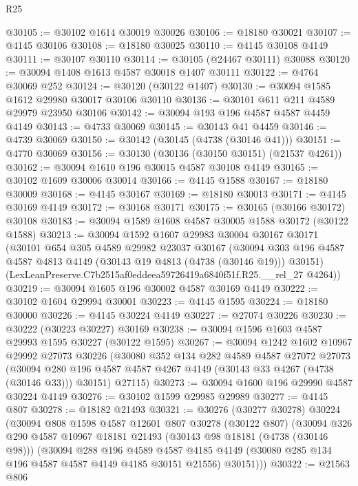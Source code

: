 \begin{lexlean}{R25}
\begin{coremodule}
@30105 := @30102 @1614 @30019 @30026
@30106 := @18180 @30021
@30107 := @4145 @30106
@30108 := @18180 @30025
@30110 := @4145 @30108 @4149
@30111 := @30107 @30110
@30114 := @30105 (@24467 @30111) @30088
@30120 := @30094 @1408 @1613 @4587 @30018 @1407 @30111
@30122 := @4764 @30069 @252
@30124 := @30120 (@30122 @1407)
@30130 := @30094 @1585 @1612 @29980 @30017 @30106 @30110
@30136 := @30101 @611 @211 @4589 @29979 @23950 @30106
@30142 := @30094 @193 @196 @4587 @4587 @4459 @4149
@30143 := @4733 @30069
@30145 := @30143 @41 @4459
@30146 := @4739 @30069
@30150 := @30142 (@30145 (@4738 (@30146 @41)))
@30151 := @4770 @30069
@30156 := @30130 (@30136 (@30150 @30151) (@21537 @4261))
@30162 := @30094 @1610 @196 @30015 @4587 @30108 @4149
@30165 := @30102 @1609 @30006 @30014
@30166 := @4145 @1588
@30167 := @18180 @30009
@30168 := @4145 @30167
@30169 := @18180 @30013
@30171 := @4145 @30169 @4149
@30172 := @30168 @30171
@30175 := @30165 (@30166 @30172) @30108
@30183 := @30094 @1589 @1608 @4587 @30005 @1588 @30172 (@30122 @1588)
@30213 := @30094
    @1592
    @1607
    @29983
    @30004
    @30167
    @30171
    (@30101
      @654
      @305
      @4589
      @29982
      @23037
      @30167
      (@30094 @303 @196 @4587 @4587 @4813 @4149 (@30143 @19 @4813 (@4738 (@30146 @19))) @30151)
      (LexLeanPreserve.C7b2515af0eddeea59726419a6840f51f.R25.__rel_27 @4264))
@30219 := @30094 @1605 @196 @30002 @4587 @30169 @4149
@30222 := @30102 @1604 @29994 @30001
@30223 := @4145 @1595
@30224 := @18180 @30000
@30226 := @4145 @30224 @4149
@30227 := @27074 @30226
@30230 := @30222 (@30223 @30227) @30169
@30238 := @30094 @1596 @1603 @4587 @29993 @1595 @30227 (@30122 @1595)
@30267 := @30094
    @1242
    @1602
    @10967
    @29992
    @27073
    @30226
    (@30080
      @352
      @134
      @282
      @4589
      @4587
      @27072
      @27073
      (@30094 @280 @196 @4587 @4587 @4267 @4149 (@30143 @33 @4267 (@4738 (@30146 @33))) @30151)
      @27115)
@30273 := @30094 @1600 @196 @29990 @4587 @30224 @4149
@30276 := @30102 @1599 @29985 @29989
@30277 := @4145 @807
@30278 := @18182 @21493
@30321 := @30276
    (@30277 @30278)
    @30224
    (@30094
      @808
      @1598
      @4587
      @12601
      @807
      @30278
      (@30122 @807)
      (@30094
        @326
        @290
        @4587
        @10967
        @18181
        @21493
        (@30143 @98 @18181 (@4738 (@30146 @98)))
        (@30094
          @288
          @196
          @4589
          @4587
          @4185
          @4149
          (@30080 @285 @134 @196 @4587 @4587 @4149 @4185 @30151 @21556)
          @30151)))
@30322 := @21563 @806

\end{coremodule}
\end{lexlean}
